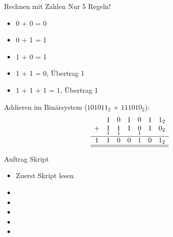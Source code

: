 \begin{frame}[fragile]{Rechnen mit Zahlen}
	Nur 5 Regeln!
	\begin{itemize}
	\item 0 + 0 = 0 
	\item 0 + 1 = 1 
	\item 1 + 0 = 1 
	\item 1 + 1 = 0, Übertrag 1
	\item 1 + 1 + 1 = 1, Übertrag 1
	\end{itemize}
	
	Addieren im Binärsystem ($101011_2$ + $111010_2$):
	\[
	\begin{array}{ccccccc}
		& 1 & 0 & 1 & 0 & 1 & 1_2 \\
		+ & \underset{1}{1} & \underset{1}{1} & \underset{}{1} & \underset{1}{0} & \underset{}{1} & \underset{}{0_2} \\
		\hline
		1 & 1 & 0 & 0 & 1 & 0 & 1_2 \\\hline\hline
	\end{array}
	\]
\end{frame}

\begin{frame}{Auftrag}
Skript
\begin{itemize}
\item Zuerst Skript lesen 
\item {}
\item {}
\item {}
\item {}
\item {}
\end{itemize}
\end{frame}